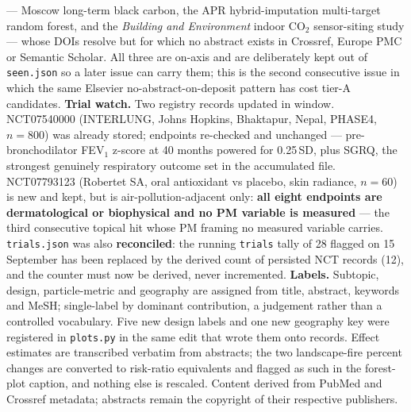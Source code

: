 \documentclass[10pt]{article}
\begin{document}
\begin{keybox}
{--- Moscow long-term black carbon, the APR hybrid-imputation multi-target random forest,
and the \textit{Building and Environment} indoor CO$_2$ sensor-siting study --- whose DOIs
resolve but for which no abstract exists in Crossref, Europe PMC or Semantic Scholar. All
three are on-axis and are deliberately kept out of \texttt{seen.json} so a later issue can
carry them; this is the second consecutive issue in which the same Elsevier
no-abstract-on-deposit pattern has cost tier-A candidates.
\textbf{Trial watch.} Two registry records updated in window. NCT07540000 (INTERLUNG,
Johns Hopkins, Bhaktapur, Nepal, PHASE4, $n=800$) was already stored; endpoints re-checked
and unchanged --- pre-bronchodilator FEV$_1$ z-score at 40 months powered for 0.25\,SD,
plus SGRQ, the strongest genuinely respiratory outcome set in the accumulated file.
NCT07793123 (Robertet SA, oral antioxidant vs placebo, skin radiance, $n=60$) is new and
kept, but is air-pollution-adjacent only: \textbf{all eight endpoints are dermatological or
biophysical and no PM variable is measured} --- the third consecutive topical hit whose PM
framing no measured variable carries. \texttt{trials.json} was also \textbf{reconciled}:
the running \texttt{trials} tally of 28 flagged on 15 September has been replaced by the
derived count of persisted NCT records (12), and the counter must now be derived, never
incremented.
\textbf{Labels.} Subtopic, design, particle-metric and geography are assigned from title,
abstract, keywords and MeSH; single-label by dominant contribution, a judgement rather than
a controlled vocabulary. Five new design labels and one new geography key were registered
in \texttt{plots.py} in the same edit that wrote them onto records.
Effect estimates are transcribed verbatim from abstracts; the two landscape-fire percent
changes are converted to risk-ratio equivalents and flagged as such in the forest-plot
caption, and nothing else is rescaled.
Content derived from PubMed and Crossref metadata; abstracts remain the copyright of their
respective publishers.\par}
\end{keybox}
\end{document}

